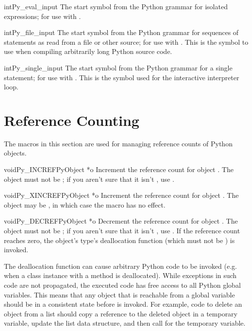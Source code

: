 \documentclass{manual}
\begin{document}
\begin{cvardesc}{int}{Py_eval_input}
  The start symbol from the Python grammar for isolated expressions;
  for use with .
\end{cvardesc}

\begin{cvardesc}{int}{Py_file_input}
  The start symbol from the Python grammar for sequences of statements
  as read from a file or other source; for use with
  .  This is
  the symbol to use when compiling arbitrarily long Python source code.
\end{cvardesc}

\begin{cvardesc}{int}{Py_single_input}
  The start symbol from the Python grammar for a single statement; for 
  use with .
  This is the symbol used for the interactive interpreter loop.
\end{cvardesc}


\chapter{Reference Counting \label{countingRefs}}

The macros in this section are used for managing reference counts
of Python objects.

\begin{cfuncdesc}{void}{Py_INCREF}{PyObject *o}
Increment the reference count for object .  The object must
not be \NULL{}; if you aren't sure that it isn't \NULL{}, use
.
\end{cfuncdesc}

\begin{cfuncdesc}{void}{Py_XINCREF}{PyObject *o}
Increment the reference count for object .  The object may be
\NULL{}, in which case the macro has no effect.
\end{cfuncdesc}

\begin{cfuncdesc}{void}{Py_DECREF}{PyObject *o}
Decrement the reference count for object .  The object must
not be \NULL{}; if you aren't sure that it isn't \NULL{}, use
.  If the reference count reaches zero, the
object's type's deallocation function (which must not be \NULL{}) is
invoked.

 The deallocation function can cause arbitrary Python
code to be invoked (e.g. when a class instance with a
 method is deallocated).  While exceptions in such
code are not propagated, the executed code has free access to all
Python global variables.  This means that any object that is reachable
from a global variable should be in a consistent state before
 is invoked.  For example, code to delete an
object from a list should copy a reference to the deleted object in a
temporary variable, update the list data structure, and then call
 for the temporary variable.
\end{cfuncdesc}
\end{document}
